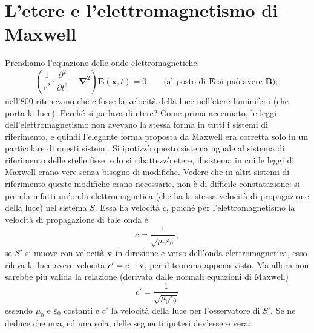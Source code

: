 \section{L'etere e l'elettromagnetismo di Maxwell}
Prendiamo l'equazione delle onde elettromagnetiche:
\begin{displaymath}
  \left(\frac{1}{c^2}\cdot\frac{\partial^2}{\partial
      t^2}-\mathbf{\nabla}^2\right)\mathbf{E}(\mathbf{x},t)=0 \qquad
  \mbox{(al posto di $\mathbf{E}$ si pu\`o avere $\mathbf{B}$)};
\end{displaymath}
nell'800 ritenevano che $c$ fosse la velocit\`a della luce nell'etere
luminifero (che porta la luce). Perch\'e si parlava di etere? 
%
%
Come prima accennato, le leggi dell'elettromagnetismo non avevano la
stessa forma in tutti i sistemi di riferimento, e quindi l'elegante
forma proposta da Maxwell era corretta solo in un particolare di questi
sistemi. Si ipotizz\`o questo sistema uguale al sistema di riferimento
delle stelle fisse, e lo si ribattezz\`o etere, il sistema in cui le
leggi di Maxwell erano vere senza bisogno di modifiche.
Vedere che in altri sistemi di riferimento queste modifiche erano
necessarie, non \`e di difficile constatazione: si prenda infatti
un'onda elettromagnetica (che ha la stessa velocit\`a di propagazione
della luce) nel sistema $S$. Essa ha velocit\`a $c$, poich\'e per
l'elettromagnetismo la velocit\`a di propagazione di tale onda \`e
\begin{equation}
  c=\frac{1}{\sqrt{\mu_0\varepsilon_0}};
\end{equation}
se $S'$ si muove con velocit\`a $\mathrm{v}$ in direzione e verso
dell'onda elettromagnetica, esso rileva la luce avere velocit\`a
$c'=c-\mathrm{v}$, per il teorema appena visto. Ma allora non sarebbe pi\`u
valida la relazione (derivata dalle normali equazioni di Maxwell)
\begin{displaymath}
  c'=\frac{1}{\sqrt{\mu_0\varepsilon_0}}
\end{displaymath}
essendo $\mu_0$ e $\varepsilon_0$ costanti e \(c'\) la velocit\`a della
luce per l'osservatore di \(S'\). Se ne deduce che una, ed
una sola, delle seguenti ipotesi dev'essere vera:
